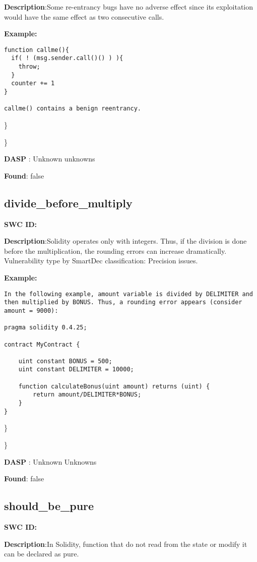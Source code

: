 \documentclass{article}
\begin{document}
\textbf{Description}:Some re-entrancy bugs have no adverse effect since its exploitation would have the same effect as two consecutive calls.


\textbf{Example:} 
\begin{verbatim}
function callme(){
  if( ! (msg.sender.call()() ) ){
    throw;
  }
  counter += 1
}

callme() contains a benign reentrancy.

\end{verbatim}\} 

\} 

\textbf{DASP} : Unknown unknowns

\textbf{Found}: false

\subsection{divide\_before\_multiply} 
\textbf{SWC \textunderscore ID:} 

\textbf{Description}:Solidity operates only with integers. Thus, if the division is done before the multiplication, the rounding errors can increase dramatically. Vulnerability type by SmartDec classification: Precision issues.


\textbf{Example:} 
\begin{verbatim}
In the following example, amount variable is divided by DELIMITER and then multiplied by BONUS. Thus, a rounding error appears (consider amount = 9000):

pragma solidity 0.4.25;

contract MyContract {

    uint constant BONUS = 500;
    uint constant DELIMITER = 10000;

    function calculateBonus(uint amount) returns (uint) {
        return amount/DELIMITER*BONUS;
    }
}

\end{verbatim}\} 

\} 

\textbf{DASP} : Unknown Unknowns

\textbf{Found}: false

\subsection{should\_be\_pure} 
\textbf{SWC \textunderscore ID:} 

\textbf{Description}:In Solidity, function that do not read from the state or modify it can be declared as pure.
\end{document}
